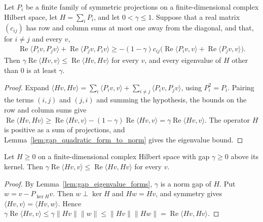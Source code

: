 \begin{theorem}
    \label{thm:gap_martingale_projections}
    \leanok
    Let $P_i$ be a finite family of symmetric projections on a finite-dimensional
    complex Hilbert space, let $H=\sum_iP_i$, and let $0<\gamma\le1$. Suppose that a
    real matrix $(c_{ij})$ has row and column sums at most one away from the diagonal,
    and that, for $i\ne j$ and every $v$,
    \begin{align*}
        \operatorname{Re}\langle P_iv,P_jv\rangle+\operatorname{Re}\langle P_jv,P_iv\rangle
        \ge-(1-\gamma)c_{ij}
        \bigl(\operatorname{Re}\langle P_iv,v\rangle+\operatorname{Re}\langle P_jv,v\rangle\bigr).
    \end{align*}
    Then $\gamma\operatorname{Re}\langle Hv,v\rangle\le\operatorname{Re}\langle Hv,Hv\rangle$
    for every $v$, and every eigenvalue of $H$ other than $0$ is at least $\gamma$.
\end{theorem}
\begin{proof}\leanok
    Expand $\langle Hv,Hv\rangle=\sum_i\langle P_iv,v\rangle+\sum_{i\ne j}
        \langle P_iv,P_jv\rangle$, using $P_i^2=P_i$. Pairing the terms $(i,j)$ and $(j,i)$
    and summing the hypothesis, the bounds on the row and column sums give
    $\operatorname{Re}\langle Hv,Hv\rangle\ge\operatorname{Re}\langle Hv,v\rangle
        -(1-\gamma)\operatorname{Re}\langle Hv,v\rangle=\gamma\operatorname{Re}\langle Hv,v\rangle$.
    The operator $H$ is positive as a sum of projections, and
    Lemma~\ref{lem:gap_quadratic_form_to_norm} gives the eigenvalue bound.
\end{proof}

\begin{lemma}
    \label{lem:gap_norm_to_quadratic_form}
    \leanok
    Let $H\ge0$ on a finite-dimensional complex Hilbert space with gap $\gamma\ge0$
    above its kernel. Then
    $\gamma\operatorname{Re}\langle Hv,v\rangle\le\operatorname{Re}\langle Hv,Hv\rangle$
    for every $v$.
\end{lemma}
\begin{proof}\leanok
    By Lemma~\ref{lem:gap_eigenvalue_forms}, $\gamma$ is a norm gap of $H$.
    Put $w=v-P_{\ker H}v$. Then $w\perp\ker H$ and $Hw=Hv$, and symmetry gives
    $\langle Hv,v\rangle=\langle Hv,w\rangle$. Hence
    $\gamma\operatorname{Re}\langle Hv,v\rangle\le\gamma\lVert Hv\rVert\lVert w\rVert
        \le\lVert Hv\rVert\lVert Hw\rVert=\operatorname{Re}\langle Hv,Hv\rangle$.
\end{proof}

